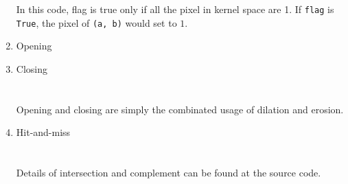 \documentclass[12pt,a4paper]{article}
\begin{document}
\begin{enumerate}[label=(\alph*)]
		In this code, flag is true only if all the pixel in kernel space are 1. If \texttt{flag} is \texttt{True}, the pixel of \texttt{(a, b)} would set to $1$.
		\newpage
	\item Opening\\
	\item Closing\\
		\\
		\\
		Opening and closing are simply the combinated usage of dilation and erosion.
		\newpage
	\item Hit-and-miss\\
		\\
		\\
		Details of intersection and complement can be found at the source code.
		

\end{enumerate}
\end{document}

